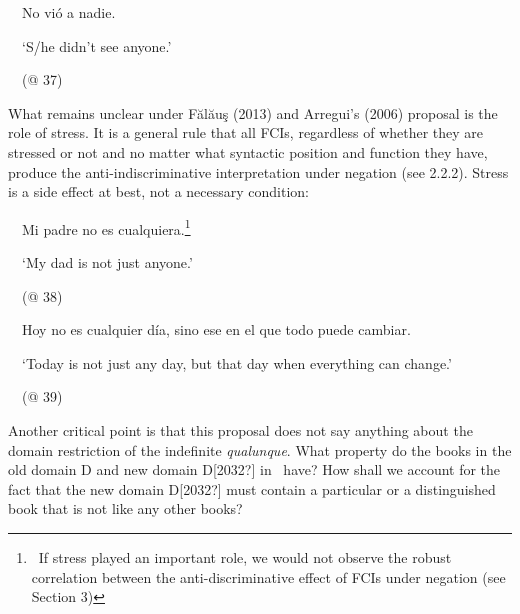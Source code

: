 \begin{styleStandard}
\ \ No vió a nadie.
\end{styleStandard}

\begin{styleStandard}
\ \ ‘S/he didn’t see anyone.’
\end{styleStandard}

\begin{styleStandard}
\ \ (@ 37)
\end{styleStandard}

\begin{styleStandard}
What remains unclear under Fălăuş (2013) and Arregui’s (2006) proposal is the role of stress. It is a general rule that all FCIs, regardless of whether they are stressed or not and no matter what syntactic position and function they have, produce the anti-indiscriminative interpretation under negation (see 2.2.2). Stress is a side effect at best, not a necessary condition:
\end{styleStandard}

\begin{styleStandard}
\label{bkm:Ref42806294}\ \ Mi padre no es cualquiera.\footnote{\ If stress played an important role, we would not observe the robust correlation between the anti-discriminative effect of FCIs under negation (see Section 3) }
\end{styleStandard}

\begin{styleStandard}
\ \ ‘My dad is not just anyone.’
\end{styleStandard}

\begin{styleStandard}
\ \ (@ 38)
\end{styleStandard}

\begin{styleStandard}
\label{bkm:Ref42806303}\ \ Hoy no es cualquier día, sino ese en el que todo puede cambiar.
\end{styleStandard}

\begin{styleStandard}
\ \ ‘Today is not just any day, but that day when everything can change.’
\end{styleStandard}

\begin{styleStandard}
\ \ (@ 39)
\end{styleStandard}

\begin{styleStandard}
Another critical point is that this proposal does not say anything about the domain restriction of the indefinite \textit{qualunque}. What property do the books in the old domain D and new domain D[2032?] in \ have? How shall we account for the fact that the new domain D[2032?] must contain a particular or a distinguished book that is not like any other books?
\end{styleStandard}

